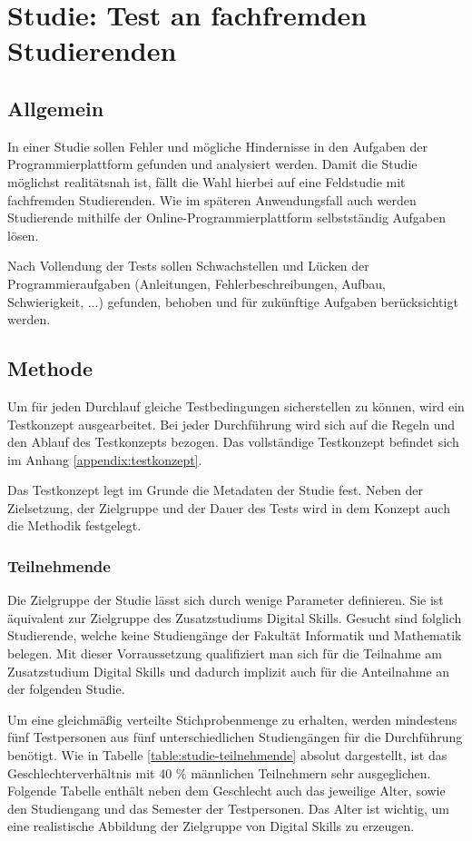 \section{Studie: Test an fachfremden Studierenden}\label{studie}
\subsection{Allgemein}
In einer Studie sollen Fehler und mögliche Hindernisse in den Aufgaben der
Programmierplattform gefunden und analysiert werden. Damit die Studie möglichst
realitätsnah ist, fällt die Wahl hierbei auf eine Feldstudie mit fachfremden
Studierenden. Wie im späteren Anwendungsfall auch werden Studierende mithilfe
der Online-Programmierplattform selbstständig Aufgaben lösen.
\parencite{feldstudie}

Nach Vollendung der Tests sollen Schwachstellen und Lücken der
Programmieraufgaben (Anleitungen, Fehlerbeschreibungen, Aufbau, Schwierigkeit,
...) gefunden, behoben und für zukünftige Aufgaben berücksichtigt werden.

\subsection{Methode}
Um für jeden Durchlauf gleiche Testbedingungen sicherstellen zu können, wird ein
Testkonzept ausgearbeitet. Bei jeder Durchführung wird sich auf die Regeln
und den Ablauf des Testkonzepts bezogen. Das vollständige Testkonzept befindet
sich im Anhang \ref{appendix:testkonzept}.

Das Testkonzept legt im Grunde die Metadaten der Studie fest. Neben der
Zielsetzung, der Zielgruppe und der Dauer des Tests wird in dem Konzept auch die
Methodik festgelegt.

\subsubsection{Teilnehmende}
Die Zielgruppe der Studie lässt sich durch wenige Parameter definieren. Sie
ist äquivalent zur Zielgruppe des Zusatzstudiums Digital Skills. Gesucht sind
folglich Studierende, welche keine Studiengänge der Fakultät Informatik und
Mathematik belegen. Mit dieser Vorraussetzung qualifiziert man sich für die
Teilnahme am Zusatzstudium Digital Skills und dadurch implizit auch für die
Anteilnahme an der folgenden Studie.

Um eine gleichmäßig verteilte Stichprobenmenge zu erhalten, werden mindestens
fünf Testpersonen aus fünf unterschiedlichen Studiengängen für die Durchführung
benötigt. Wie in Tabelle \ref{table:studie-teilnehmende} absolut dargestellt,
ist das Geschlechterverhältnis mit 40 \% männlichen Teilnehmern sehr
ausgeglichen. Folgende Tabelle enthält neben dem Geschlecht auch das jeweilige
Alter, sowie den Studiengang und das Semester der Testpersonen. Das Alter ist
wichtig, um eine realistische Abbildung der Zielgruppe von Digital Skills zu
erzeugen.

